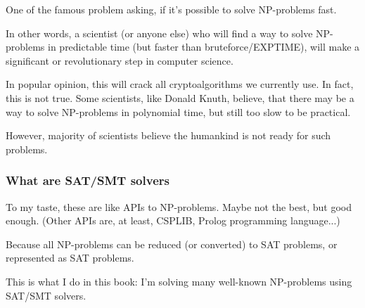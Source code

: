 One of the famous problem asking, if it's possible to solve NP-problems fast.

In other words, a scientist (or anyone else) who will find a way to solve NP-problems in predictable time (but faster than bruteforce/EXPTIME),
will make a significant or revolutionary step in computer science.

In popular opinion, this will crack all cryptoalgorithms we currently use.
In fact, this is not true.
Some scientists, like Donald Knuth, believe, that there may be a way to solve NP-problems in polynomial time, but still too
slow to be practical.

However, majority of scientists believe the humankind is not ready for such problems.

\subsubsection{What are SAT/SMT solvers}

To my taste, these are like APIs to NP-problems.
Maybe not the best, but good enough.
(Other APIs are, at least, CSPLIB, Prolog programming language...)

Because all NP-problems can be reduced (or converted) to SAT problems, or represented as SAT problems.

This is what I do in this book: I'm solving many well-known NP-problems using SAT/SMT solvers.

